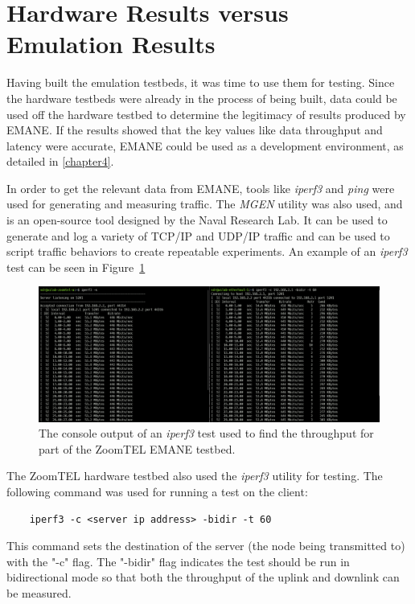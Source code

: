 \section{Hardware Results versus Emulation Results}
Having built the emulation testbeds, it was time to use them for testing.
Since the hardware testbeds were already in the process of being built, data could be used off the hardware testbed to determine the legitimacy of results produced by EMANE.
If the results showed that the key values like data throughput and latency were accurate, EMANE could be used as a development environment, as detailed in \ref{chapter4}.\par
In order to get the relevant data from EMANE, tools like \textit{iperf3} and \textit{ping} were used for generating and measuring traffic.
The \textit{MGEN} utility was also used, and is an open-source tool designed by the Naval Research Lab.
It can be used to generate and log a variety of TCP/IP and UDP/IP traffic and can be used to script traffic behaviors to create repeatable experiments.
An example of an \textit{iperf3} test can be seen in Figure~\ref{iperf_test}
\begin{figure}[!ht]
    \centering
    \includegraphics[width=\textwidth,keepaspectratio]{Images/Chpt3/ThroughputTest.png}
    \caption{The console output of an \textit{iperf3} test used to find the throughput for part of the ZoomTEL EMANE testbed.}
    \label{iperf_test}
\end{figure}
The ZoomTEL hardware testbed also used the \textit{iperf3} utility for testing.
The following command was used for running a test on the client:
\begin{verbatim}
    iperf3 -c <server ip address> -bidir -t 60
\end{verbatim}
This command sets the destination of the server (the node being transmitted to) with the "-c" flag.
The "-bidir" flag indicates the test should be run in bidirectional mode so that both the throughput of the uplink and downlink can be measured.
